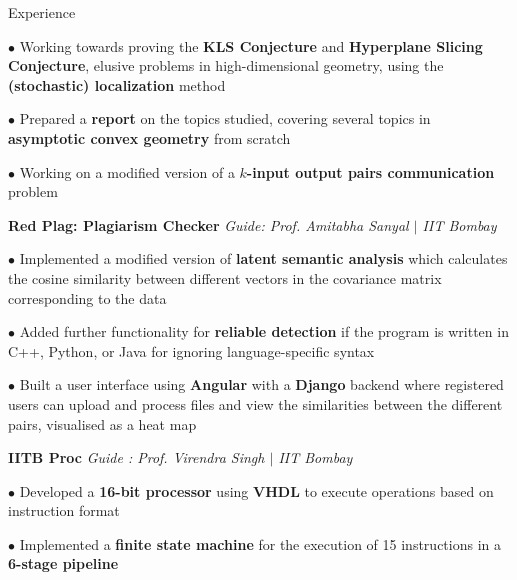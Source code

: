 \begin{rubric}{Experience}
    \entry*[2021]  
        
        $\bullet$ Working towards proving the \textbf{KLS Conjecture} and \textbf{Hyperplane Slicing Conjecture}, elusive problems in high-dimensional geometry, using the \textbf{(stochastic) localization} method

        $\bullet$ Prepared a \textbf{report} on the topics studied, covering several topics in \textbf{asymptotic convex geometry} from scratch

        $\bullet$ Working on a modified version of a \textbf{$k$-input output pairs communication} problem

    \entry*[2020] \textbf{Red Plag: Plagiarism Checker} \hfill \emph{Guide: Prof. Amitabha Sanyal $\mid$ IIT Bombay}
	    
	    $\bullet$ Implemented a modified version of \textbf{latent semantic analysis} which calculates the cosine similarity between different vectors in the covariance matrix corresponding to the data
        
        $\bullet$ Added further functionality for \textbf{reliable detection} if the program is written in C++, Python, or Java for ignoring language-specific syntax

        $\bullet$ Built a user interface using \textbf{Angular} with a \textbf{Django} backend where registered users can upload and process files and view the similarities between the different pairs, visualised as a heat map

    \entry*[2021] \textbf{IITB Proc} \hfill \emph{Guide : Prof. Virendra Singh $\mid$ IIT Bombay}
        
        $\bullet$ Developed a \textbf{16-bit processor} using \textbf{VHDL} to execute operations based on instruction format

        $\bullet$ Implemented a \textbf{finite state machine} for the execution of 15 instructions in a \textbf{6-stage pipeline}


        
        
\end{rubric}